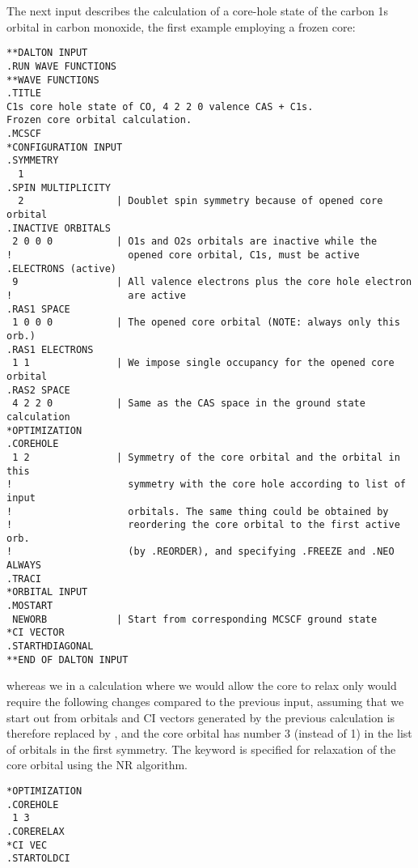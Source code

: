 The next input describes the calculation of a core-hole
state of the carbon 1s orbital in carbon monoxide, the first
example employing a frozen core:

\begin{verbatim}
**DALTON INPUT
.RUN WAVE FUNCTIONS
**WAVE FUNCTIONS
.TITLE
C1s core hole state of CO, 4 2 2 0 valence CAS + C1s.
Frozen core orbital calculation.
.MCSCF
*CONFIGURATION INPUT
.SYMMETRY
  1
.SPIN MULTIPLICITY
  2                | Doublet spin symmetry because of opened core orbital
.INACTIVE ORBITALS
 2 0 0 0           | O1s and O2s orbitals are inactive while the
!                    opened core orbital, C1s, must be active
.ELECTRONS (active)
 9                 | All valence electrons plus the core hole electron
!                    are active
.RAS1 SPACE
 1 0 0 0           | The opened core orbital (NOTE: always only this orb.)
.RAS1 ELECTRONS
 1 1               | We impose single occupancy for the opened core orbital
.RAS2 SPACE
 4 2 2 0           | Same as the CAS space in the ground state calculation
*OPTIMIZATION
.COREHOLE
 1 2               | Symmetry of the core orbital and the orbital in this
!                    symmetry with the core hole according to list of input
!                    orbitals. The same thing could be obtained by
!                    reordering the core orbital to the first active orb.
!                    (by .REORDER), and specifying .FREEZE and .NEO ALWAYS
.TRACI
*ORBITAL INPUT
.MOSTART
 NEWORB            | Start from corresponding MCSCF ground state
*CI VECTOR
.STARTHDIAGONAL
**END OF DALTON INPUT
\end{verbatim}
\label{sirius_ex6}


whereas we in a calculation where we would allow the core to
relax only would require the following changes
compared to the previous input, assuming that we start out from
orbitals and CI vectors generated by the previous calculation
 is therefore replaced by , and
the core orbital has number 3 (instead of 1) in the list of
orbitals in the first symmetry. The  keyword is specified for
relaxation of the core orbital using the NR algorithm.

\begin{verbatim}
*OPTIMIZATION
.COREHOLE
 1 3
.CORERELAX
*CI VEC
.STARTOLDCI
\end{verbatim}
\label{sirius_ex7}

